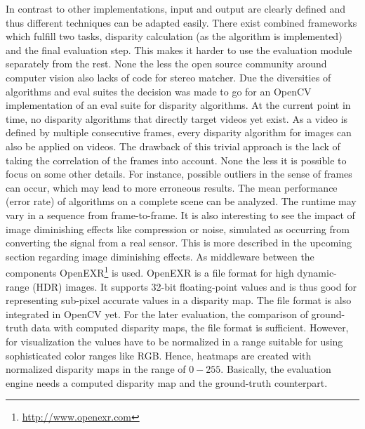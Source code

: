 In contrast to other implementations, input and output are clearly defined and thus different techniques can be adapted easily.
There exist combined frameworks which fulfill two tasks, disparity calculation (as the algorithm is implemented) and the final evaluation step.
This makes it harder to use the evaluation module separately from the rest.
None the less the open source community around computer vision also lacks of code for stereo matcher.
Due the diversities of algorithms and eval suites the decision was made to go for an OpenCV implementation of an eval suite for disparity algorithms.
\newline\newline\noindent At the current point in time, no disparity algorithms that directly target videos yet exist.
As a video is defined by multiple consecutive frames, every disparity algorithm for images can also be applied on videos.
The drawback of this trivial approach is the lack of taking the correlation of the frames into account.
None the less it is possible to focus on some other details.
\newline\newline\noindent For instance, possible outliers in the sense of frames can occur, which may lead to more erroneous results.
The mean performance (error rate) of algorithms on a complete scene can be analyzed.
The runtime may vary in a sequence from frame-to-frame.
It is also interesting to see the impact of image diminishing effects like compression or noise, simulated as occurring from converting the signal from a real sensor.
This is more described in the upcoming section regarding image diminishing effects.
\newline\newline\noindent As middleware between the components OpenEXR\footnote{\url{http://www.openexr.com}} is used.
OpenEXR is a file format for high dynamic-range (HDR) images.
It supports 32-bit floating-point values and is thus good for representing sub-pixel accurate values in a disparity map.
The file format is also integrated in OpenCV yet.
For the later evaluation, the comparison of ground-truth data with computed disparity maps, the file format is sufficient.
However, for visualization the values have to be normalized in a range suitable for using sophisticated color ranges like RGB.
Hence, heatmaps are created with normalized disparity maps in the range of $0-255$.
\newline\newline\noindent Basically, the evaluation engine needs a computed disparity map and the ground-truth counterpart.
